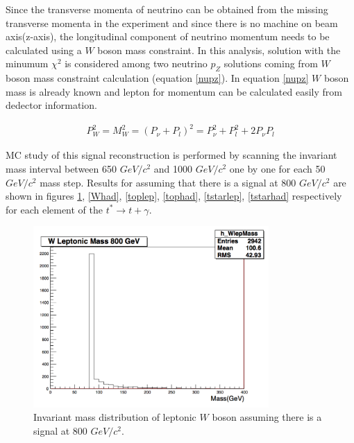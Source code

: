 \documentclass[12pt,oneandhalf,chaparabic,phys,ms,eng]{metu}
\begin{document}
Since the transverse momenta of neutrino can be obtained from the missing transverse momenta in the experiment and since there is no machine on beam axis(z-axis), the longitudinal component of neutrino momentum needs to be calculated using a $W$ boson mass constraint. In this analysis, solution with the minumum ${\chi}^2$ is considered among two neutrino $p_Z$ solutions coming from $W$ boson mass constraint calculation (equation \ref{nupz}). In equation \ref{nupz} $W$ boson mass is already known and lepton for momentum can be calculated easily from dedector information. 

\begin{eqnarray}
\label{nupz}
	P^2_W  = M^2_W = (P_{\nu} + P_{l})^2 = P^2_{\nu} + P^2_{l} + 2P_{\nu}P_{l}
\end{eqnarray}

MC study of this signal reconstruction is performed by scanning the invariant mass interval between  650 $GeV/c^2$ and 1000 $GeV/c^2$ one by one for each 50 $GeV/c^2$ mass step. Results for assuming that there is a signal at 800 $GeV/c^2$ are shown in figures \ref{Wlep}, \ref{Whad}, \ref{toplep}, \ref{tophad}, \ref{tstarlep}, \ref{tstarhad} respectively for each element of the $t^* \rightarrow t + \gamma$.

\begin{figure}[!h]
\centering
    \includegraphics[width=0.8\textwidth]{Wlep}
    \caption{\label{Wlep} Invariant mass distribution of leptonic $W$ boson assuming there is a signal at 800 $GeV/c^2$.}
\end{figure}
\end{document}
